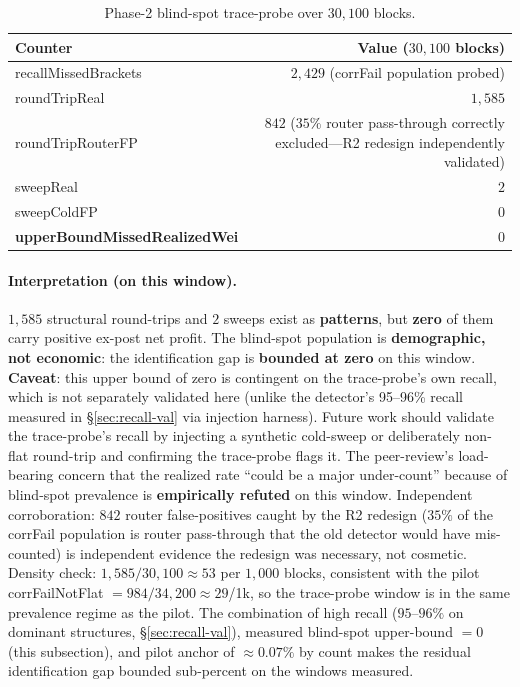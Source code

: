 \documentclass[11pt]{article}
\begin{document}
\begin{table}[h]\centering
\caption{Phase-2 blind-spot trace-probe over $30{,}100$ blocks.}\label{tab:traceprobe}
\begin{tabular}{lr}
\toprule
Counter & Value ($30{,}100$ blocks) \\
\midrule
recallMissedBrackets & $2{,}429$ (corrFail population probed) \\
roundTripReal & $1{,}585$ \\
roundTripRouterFP & \textbf{$842$} ($35\%$ router pass-through correctly excluded---R2 redesign independently validated) \\
sweepReal & $2$ \\
sweepColdFP & $0$ \\
\textbf{upperBoundMissedRealizedWei} & \textbf{$0$} \\
\bottomrule
\end{tabular}
\end{table}

\paragraph{Interpretation (on this window).} $1{,}585$ structural round-trips and $2$
sweeps exist as \textbf{patterns}, but \textbf{zero} of them carry positive ex-post
net profit. The blind-spot population is \textbf{demographic, not economic}: the
identification gap is \textbf{bounded at zero} on this window. \textbf{Caveat}: this
upper bound of zero is contingent on the trace-probe's own recall, which is not
separately validated here (unlike the detector's 95--96\% recall measured in
\S\ref{sec:recall-val} via injection harness). Future work should validate the
trace-probe's recall by injecting a synthetic cold-sweep or deliberately non-flat
round-trip and confirming the trace-probe flags it. The peer-review's
load-bearing concern that the realized rate ``could be a major under-count'' because
of blind-spot prevalence is \textbf{empirically refuted} on this window. Independent
corroboration: $842$ router false-positives caught by the R2 redesign ($35\%$ of the
corrFail population is router pass-through that the old detector would have
mis-counted) is independent evidence the redesign was necessary, not cosmetic.
Density check: $1{,}585 / 30{,}100 \approx 53$ per $1{,}000$ blocks, consistent with
the pilot corrFailNotFlat $= 984/34{,}200 \approx 29$/1k, so the trace-probe window is
in the same prevalence regime as the pilot. The combination of high recall ($95$--$96\%$
on dominant structures, \S\ref{sec:recall-val}), measured blind-spot upper-bound $=0$
(this subsection), and pilot anchor of $\approx$$0.07\%$ by count makes the residual
identification gap bounded sub-percent on the windows measured.
\end{document}
